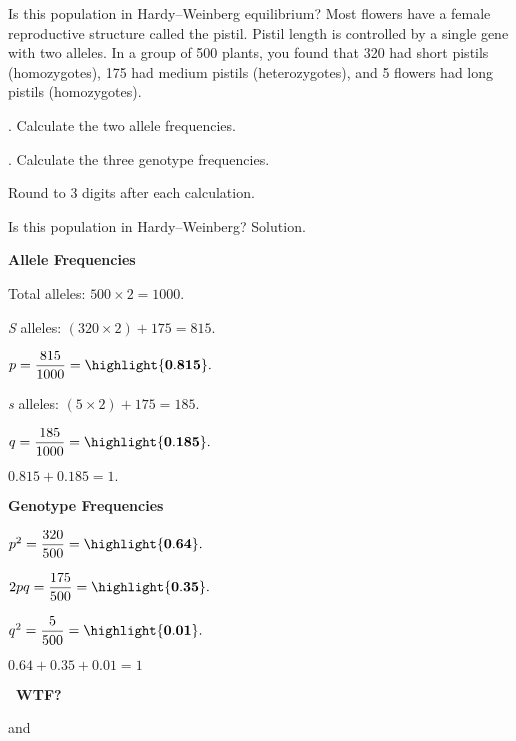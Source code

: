 \documentclass[t,handout]{beamer}  %
\begin{document}
\begin{frame}{Is this population in Hardy--Weinberg equilibrium?}
	\vspace{-1\baselineskip}
	\hangpara Most flowers have a female reproductive structure called the pistil. Pistil length is controlled by a single gene with two alleles. In a group of 500 plants, you found that 320 had short pistils (homozygotes), 175 had medium pistils (heterozygotes), and 5 flowers had long pistils (homozygotes). 

	. Calculate the two allele frequencies.

	. Calculate the three genotype frequencies.

	\hangpara Round to 3 digits after each calculation.
\end{frame}
%
{
\begin{frame}{Is this population in Hardy--Weinberg? Solution.}
\vspace{-1\baselineskip}
\begin{multicols}{2}

	\hangpara \textbf{Allele Frequencies}
	
	\hangpara Total alleles: $500 \times 2 = 1000.$
	
	\hangpara \emph{S} alleles: $(320 \times 2) + 175 = 815.$
	
	\hangpara $p = \dfrac{815}{1000} = \highlight{\mathbf{0.815}}.$

	\hangpara \emph{s} alleles: $(5 \times 2) + 175 = 185.$ 

	\hangpara $q = \dfrac{185}{1000} = \highlight{\mathbf{0.185}}.$
	
	\hangpara $0.815 + 0.185 = 1.$ \checkmark

\columnbreak

	\hangpara \textbf{Genotype Frequencies}
	
	\hangpara $p^2 = \dfrac{320}{500} = \highlight{\mathbf{0.64}}.$ 

	\hangpara $2pq = \dfrac{175}{500} = \highlight{\mathbf{0.35}}.$

	\hangpara $q^2 = \dfrac{5}{500} = \highlight{\mathbf{0.01}}.$

	\hangpara $0.64 + 0.35 + 0.01 = 1$ \checkmark
	
	\hangpara {}
	\textbf{\ WTF?}\vspace{-0.5\baselineskip}
	
	\hangpara {} and
	

\end{multicols}
\end{frame}
}
\end{document}
